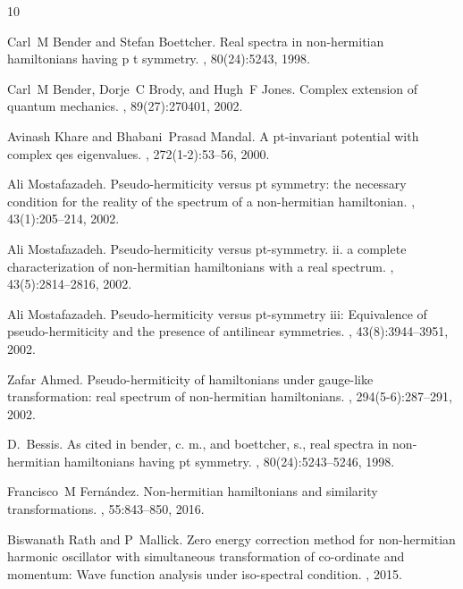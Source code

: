 \documentclass[a4paper, 12pt]{article}
\begin{document}
\begin{thebibliography}{10}

  Carl~M Bender and Stefan Boettcher.
  \newblock Real spectra in non-hermitian hamiltonians having p t symmetry.
  , 80(24):5243, 1998.
  
  Carl~M Bender, Dorje~C Brody, and Hugh~F Jones.
  \newblock Complex extension of quantum mechanics.
  , 89(27):270401, 2002.
  
  Avinash Khare and Bhabani~Prasad Mandal.
  \newblock A pt-invariant potential with complex qes eigenvalues.
  , 272(1-2):53--56, 2000.
  
  Ali Mostafazadeh.
  \newblock Pseudo-hermiticity versus pt symmetry: the necessary condition for
    the reality of the spectrum of a non-hermitian hamiltonian.
  , 43(1):205--214, 2002.
  
  Ali Mostafazadeh.
  \newblock Pseudo-hermiticity versus pt-symmetry. ii. a complete
    characterization of non-hermitian hamiltonians with a real spectrum.
  , 43(5):2814--2816, 2002.
  
  Ali Mostafazadeh.
  \newblock Pseudo-hermiticity versus pt-symmetry iii: Equivalence of
    pseudo-hermiticity and the presence of antilinear symmetries.
  , 43(8):3944--3951, 2002.
  
  Zafar Ahmed.
  \newblock Pseudo-hermiticity of hamiltonians under gauge-like transformation:
    real spectrum of non-hermitian hamiltonians.
  , 294(5-6):287--291, 2002.
  
  D.~Bessis.
  \newblock As cited in bender, c. m., and boettcher, s., real spectra in
    non-hermitian hamiltonians having pt symmetry.
  , 80(24):5243--5246, 1998.
  
  Francisco~M Fern{\'a}ndez.
  \newblock Non-hermitian hamiltonians and similarity transformations.
  , 55:843--850,
    2016.
  
  Biswanath Rath and P~Mallick.
  \newblock Zero energy correction method for non-hermitian harmonic oscillator
    with simultaneous transformation of co-ordinate and momentum: Wave function
    analysis under iso-spectral condition.
  , 2015.
  

\end{thebibliography}
\end{document}
